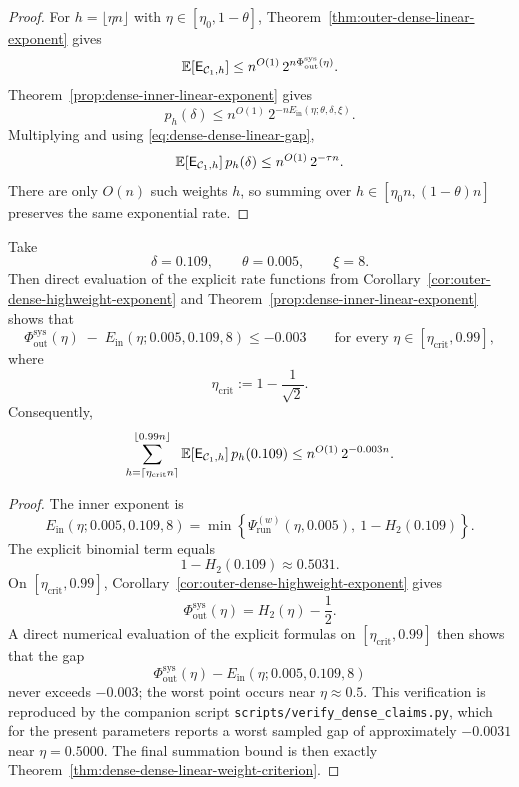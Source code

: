 \begin{proof}
For \(h=\lfloor \eta n\rfloor\) with \(\eta\in[\eta_0,1-\theta]\), Theorem~\ref{thm:outer-dense-linear-exponent} gives
\[
\mathbb{E}[\mathsf{E}_{{\mathcal{C}_1},h}]
\le
n^{O(1)}\,2^{n\Phi_{\mathrm{out}}^{\mathrm{sys}}(\eta)}.
\]
Theorem~\ref{prop:dense-inner-linear-exponent} gives
\[
p_h(\delta)
\le
n^{O(1)}\,2^{-nE_{\mathrm{in}}(\eta;\theta,\delta,\xi)}.
\]
Multiplying and using \eqref{eq:dense-dense-linear-gap},
\[
\mathbb{E}[\mathsf{E}_{{\mathcal{C}_1},h}]\,p_h(\delta)
\le
n^{O(1)}\,2^{-\tau n}.
\]
There are only \(O(n)\) such weights \(h\), so summing over
\(h\in[\eta_0 n,(1-\theta)n]\) preserves the same exponential rate.
\end{proof}

\begin{theorem}
\label{prop:dense-dense-highweight-gap}
Take
\[
\delta=0.109,
\qquad
\theta=0.005,
\qquad
\xi=8.
\]
Then direct evaluation of the explicit rate functions from
Corollary~\ref{cor:outer-dense-highweight-exponent} and
Theorem~\ref{prop:dense-inner-linear-exponent} shows that
\[
\Phi_{\mathrm{out}}^{\mathrm{sys}}(\eta)
\;
-\;
E_{\mathrm{in}}(\eta;0.005,0.109,8)
\le -0.003
\qquad
\text{for every }\eta\in[\eta_{\mathrm{crit}},0.99],
\]
where
\[
\eta_{\mathrm{crit}}:=1-\frac{1}{\sqrt2}.
\]
Consequently,
\[
\sum_{h=\lceil \eta_{\mathrm{crit}}n\rceil}^{\lfloor 0.99n\rfloor}
\mathbb{E}[\mathsf{E}_{{\mathcal{C}_1},h}]\,p_h(0.109)
\le
n^{O(1)}\,2^{-0.003n}.
\]
\end{theorem}

\begin{proof}
The inner exponent is
\[
E_{\mathrm{in}}(\eta;0.005,0.109,8)
=
\min\!\left\{
\Psi_{\mathrm{run}}^{(w)}(\eta,0.005),\
1-H_2(0.109)
\right\}.
\]
The explicit binomial term equals
\[
1-H_2(0.109)\approx 0.5031.
\]
On \([\eta_{\mathrm{crit}},0.99]\), Corollary~\ref{cor:outer-dense-highweight-exponent} gives
\[
\Phi_{\mathrm{out}}^{\mathrm{sys}}(\eta)=H_2(\eta)-\frac12.
\]
A direct numerical evaluation of the explicit formulas on \([\eta_{\mathrm{crit}},0.99]\) then shows that the gap
\[
\Phi_{\mathrm{out}}^{\mathrm{sys}}(\eta)-E_{\mathrm{in}}(\eta;0.005,0.109,8)
\]
never exceeds \(-0.003\); the worst point occurs near \(\eta\approx 0.5\).
This verification is reproduced by the companion script
\texttt{scripts/verify\_dense\_claims.py}, which for the present parameters reports a worst sampled gap
of approximately \(-0.0031\) near \(\eta=0.5000\).
The final summation bound is then exactly Theorem~\ref{thm:dense-dense-linear-weight-criterion}.
\end{proof}

